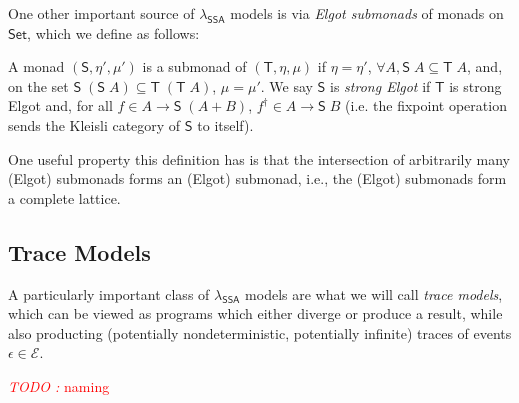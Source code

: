 \documentclass[acmsmall,screen,review]{acmart}
\newcounter{todos}
\newcommand{\TODO}[1]{{
  \stepcounter{todos}
  \begin{center}\large{\textcolor{red}{\emph{TODO \arabic{todos}:} #1}}\end{center}
}}
\newcommand{\mc}[1]{\ensuremath{\mathcal{#1}}}
\newcommand{\ms}[1]{\ensuremath{\mathsf{#1}}}
\newcommand{\isotopessa}{\(\lambda_{\ms{SSA}}\)}
\begin{document}
One other important source of \isotopessa{} models is via \emph{Elgot submonads}
of monads on \ms{Set}, which we define as follows:
\begin{definition}
  A monad $(\ms{S}, \eta', \mu')$ is a submonad of $(\ms{T}, \eta, \mu)$ if
  $\eta = \eta'$, $\forall A, \ms{S}\;A \subseteq \ms{T}\;A$, and, on the set
  $\ms{S}\;(\ms{S}\;A) \subseteq \ms{T}\;(\ms{T}\;A)$, $\mu = \mu'$. We say
  $\ms{S}$ is \emph{strong Elgot} if $\ms{T}$ is strong Elgot and, for all $f
  \in A \to \ms{S}\;(A + B)$, $f^\dagger \in A \to \ms{S}\;B$ (i.e. the fixpoint
  operation sends the Kleisli category of $\ms{S}$ to itself).
\end{definition}
One useful property this definition has is that the intersection of arbitrarily many (Elgot)
submonads forms an (Elgot) submonad, i.e., the (Elgot) submonads form a complete lattice.

\subsection{Trace Models}

A particularly important class of \isotopessa{} models are what we will call
\emph{trace models}, which can be viewed as programs which either diverge or
produce a result, while also producting (potentially nondeterministic,
potentially infinite) traces of events $\epsilon \in \mc{E}$.

\TODO{naming}
\end{document}
